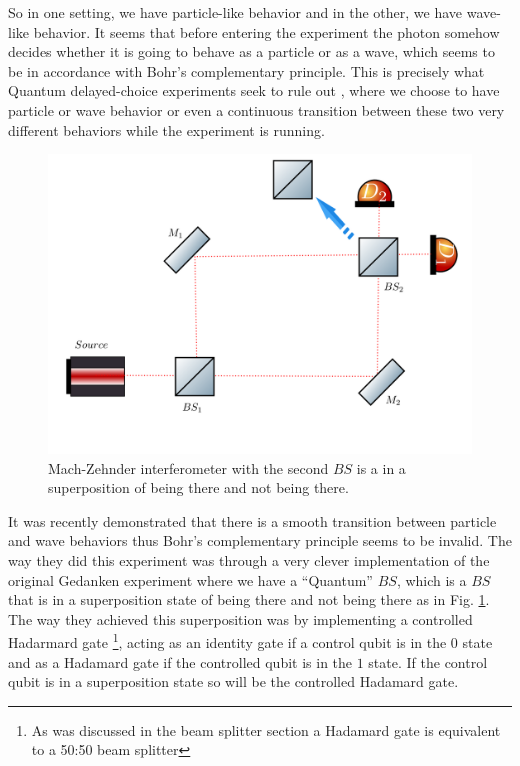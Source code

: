 \documentclass{book}
\begin{document}
So in one setting, we have particle-like behavior and in the other, we have wave-like behavior. It seems that before entering the experiment the photon somehow decides whether it is going to behave as a particle or as a wave, which seems to be in accordance with Bohr's complementary principle. This is precisely what Quantum delayed-choice experiments seek to rule out \cite{Ma}, where we choose to have particle or wave behavior or even a continuous transition between these two very different behaviors while the experiment is running.

\begin{figure}[H]
\centering
\includegraphics[width=\linewidth,height=7.5 cm]{images/wheeler3.png}
\caption{Mach-Zehnder interferometer with the second $BS$ is a in a superposition of being there and not being there.}
\label{wheeler3}
\end{figure}

It was recently demonstrated \cite{Peruzzo, Kaiser2012} that there is a smooth transition between particle and wave behaviors thus Bohr's complementary principle seems to be invalid. The way they did this experiment was through a very clever implementation of the original Gedanken experiment where we have a ``Quantum'' $BS$, which is a $BS$ that is in a superposition state of being there and not being there as in Fig. \ref{wheeler3}. The way they achieved this superposition was by implementing a controlled Hadarmard gate \footnote{As was discussed in the beam splitter section a Hadamard gate is equivalent to a 50:50 beam splitter}, acting as an identity gate if a control qubit is in the $0$ state and as a Hadamard gate if the controlled qubit is in the $1$ state.  If the control qubit is in a superposition state so will be the controlled Hadamard gate.
\end{document}
